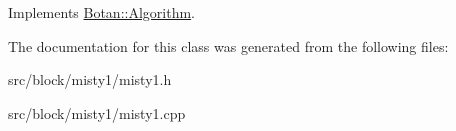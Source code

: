 Implements \hyperlink{classBotan_1_1Algorithm_a42d3ee39e051eba01ecace201fe1e6fd}{Botan\-::\-Algorithm}.



The documentation for this class was generated from the following files\-:\begin{DoxyCompactItemize}
\item 
src/block/misty1/misty1.\-h\item 
src/block/misty1/misty1.\-cpp\end{DoxyCompactItemize}
